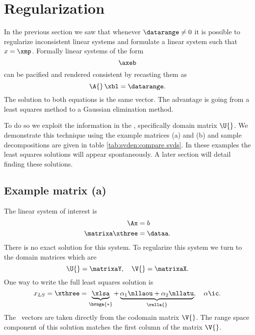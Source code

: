 \section{Regularization}
In the previous section we saw that whenever $\datarange\ne0$ it is possible to regularize inconsistent linear systems and formulate a linear system such that $x=\xmp$. Formally linear systems of the form
\begin{equation*}
  \axeb
\end{equation*}
can be pacified and rendered consistent by recasting them as
\begin{equation*}
  \A{}\, \xbl = \datarange.
\end{equation*}
The solution to both equations is the same vector. The advantage is going from a least squares method to a Gaussian elimination method. 


To do so we exploit the information in the \asvd, specifically domain matrix $\U{}$. We demonstrate this technique using the example matrices (a) and (b) and sample decompositions are given in table \eqref{tab:svden:compare svds}. In these examples the least squares solutions will appear spontaneously. A later section will detail finding these solutions.

\subsection{Example matrix (a)}
The linear system of interest is
%
\begin{equation}
  \begin{split}
    \Ax &= b \\
    \matrixa \xthree &= \dataa.
  \end{split}
  \label{eq:ls:a}
\end{equation}
%
There is no exact solution for this system. To regularize this system we turn to the domain matrices which are
\begin{equation}
  \U{} = \matrixaY, \quad \V{} = \matrixaX .
\end{equation}
%
One way to write the full least squares solution is
%
\begin{equation}
  x_{LS} = \xthree = \underbrace{\xlsa}_{\brnga{*}} + \underbrace{\alpha_{1} \nllaou  + \alpha_{2} \nllatu}_{\rnlla{}}, \quad \alpha\ic.
\end{equation}
%
The \ns\ vectors are taken directly from the codomain matrix $\V{}$. The range space component of this solution matches the first column of the matrix $\V{}$.  

